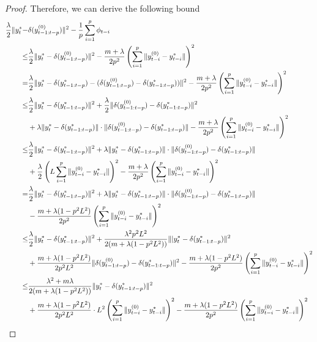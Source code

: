 \begin{proof}
Therefore, we can derive the following bound 
\begin{subequations}\allowdisplaybreaks
\begin{align}
    \frac{\lambda}{2}\|y_t^*-&\delta(y_{t-1:t-p}^{(0)})\|^2-\frac{1}{p}\sum_{i=1}^p\phi_{t-i}\notag\\
    \le&\frac{\lambda}{2}\|y_t^*-\delta(y_{t-1:t-p}^{(0)})\|^2-\frac{m+\lambda}{2p^2}\left(\sum_{i=1}^p\|y_{t-i}^{(0)}-y_{t-i}^*\|\right)^2\label{appendix.c.bound.1}\\
    =&\frac{\lambda}{2}\|y_t^*-\delta(y_{t-1:t-p}^*)-(\delta(y_{t-1:t-p}^{(0)})-\delta(y_{t-1:t-p}^*))\|^2-\frac{m+\lambda}{2p^2}\left(\sum_{i=1}^p\|y_{t-i}^{(0)}-y_{t-i}^*\|\right)^2\notag\\
    \le&\frac{\lambda}{2}\|y_t^*-\delta(y_{t-1:t-p}^*)\|^2+\frac{\lambda}{2}\|\delta(y_{t-1:t-p}^{(0)})-\delta(y_{t-1:t-p}^*)\|^2\notag\\&+\lambda\|y_t^*-\delta(y_{t-1:t-p}^*)\|\cdot\|\delta(y_{t-1:t-p}^{(0)})-\delta(y_{t-1:t-p}^*)\|-\frac{m+\lambda}{2p^2}\left(\sum_{i=1}^p\|y_{t-i}^{(0)}-y_{t-i}^*\|\right)^2\label{appendix.c.bound.2}\\
    \le&\frac{\lambda}{2}\|y_t^*-\delta(y_{t-1:t-p}^*)\|^2+\lambda\|y_t^*-\delta(y_{t-1:t-p}^*)\|\cdot\|\delta(y_{t-1:t-p}^{(0)})-\delta(y_{t-1:t-p}^*)\|\notag\\
    &+\frac{\lambda}{2}\left(L\sum_{i=1}^p\|y_{t-i}^{(0)}-y_{t-i}^*\|\right)^2-\frac{m+\lambda}{2p^2}\left(\sum_{i=1}^p\|y_{t-i}^{(0)}-y_{t-i}^*\|\right)^2\label{appendix.c.bound.3}\\
     =&\frac{\lambda}{2}\|y_t^*-\delta(y_{t-1:t-p}^*)\|^2+\lambda\|y_t^*-\delta(y_{t-1:t-p}^*)\|\cdot\|\delta(y_{t-1:t-p}^{(0)})-\delta(y_{t-1:t-p}^*)\|\notag\\
    &-\frac{m+\lambda(1-p^2L^2)}{2p^2}\left(\sum_{i=1}^p\|y_{t-i}^{(0)}-y_{t-i}^*\|\right)^2\notag\\
    \le&\frac{\lambda}{2}\|y_t^*-\delta(y_{t-1:t-p}^*)\|^2+\frac{\lambda^2p^2L^2}{2(m+\lambda(1-p^2L^2))}\||y_t^*-\delta(y_{t-1:t-p}^*)\|^2\notag\\
    &+\frac{m+\lambda(1-p^2L^2)}{2p^2L^2}\|\delta(y_{t-1:t-p}^{(0)})-\delta(y_{t-1:t-p}^*)\|^2-\frac{m+\lambda(1-p^2L^2)}{2p^2}\left(\sum_{i=1}^p\|y_{t-i}^{(0)}-y_{t-i}^*\|\right)^2\label{appendix.c.bound.4}\\
    \le&\frac{\lambda^2+m\lambda}{2(m+\lambda(1-p^2L^2))}\|y_t^*-\delta(y_{t-1:t-p}^*)\|^2\notag\\
    &+\frac{m+\lambda(1-p^2L^2)}{2p^2L^2}\cdot L^2\left(\sum_{i=1}^p\|y_{t-i}^{(0)}-y_{t-i}^*\|\right)^2-\frac{m+\lambda(1-p^2L^2)}{2p^2}\left(\sum_{i=1}^p\|y_{t-i}^{(0)}-y_{t-i}^*\|\right)^2\label{appendix.c.bound.5}\\

\end{align}
\end{subequations}
\end{proof}
